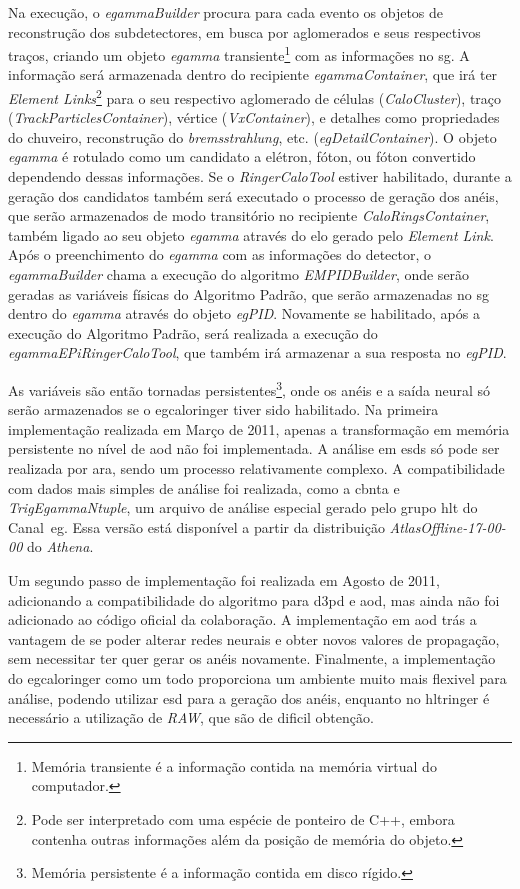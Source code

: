 Na execução, o \emph{egammaBuilder}
procura para cada evento os objetos de reconstrução dos subdetectores,
em busca por aglomerados e seus respectivos traços, criando um objeto 
\emph{egamma} transiente\footnote{Memória transiente é a informação contida na memória 
virtual do computador.} com as informações no \gls{sg}. A informação será
armazenada dentro do recipiente \emph{egammaContainer}, que irá ter \emph{Element
Links}\footnote{Pode ser interpretado com uma espécie de ponteiro de C++, embora
contenha outras informações além da posição de memória do objeto.} para o seu
respectivo aglomerado de células (\emph{CaloCluster}), traço
(\emph{TrackParticlesContainer}), vértice (\emph{VxContainer}), e detalhes como
propriedades do chuveiro, reconstrução do \emph{bremsstrahlung}, etc. (\emph{egDetailContainer}). 
O objeto \emph{egamma} é rotulado como um candidato a elétron, fóton, ou 
fóton convertido dependendo dessas informações. Se o \emph{RingerCaloTool}
estiver habilitado, durante a geração dos candidatos também será executado o
processo de geração dos anéis, que serão armazenados de modo transitório no
recipiente \emph{CaloRingsContainer}, também ligado ao seu objeto \emph{egamma}
através do elo gerado pelo \emph{Element Link}. Após o preenchimento do
\emph{egamma} com as informações do detector, o \emph{egammaBuilder} chama a
execução do algoritmo \emph{EMPIDBuilder}, onde serão geradas as variáveis 
físicas do Algoritmo Padrão, que serão armazenadas no \gls{sg} dentro do
\emph{egamma} através do objeto \emph{egPID}. Novamente se habilitado, após a
execução do Algoritmo Padrão, será realizada a execução do
\emph{egammaEPiRingerCaloTool}, que também irá armazenar a sua resposta no
\emph{egPID}.

As variáveis são então tornadas persistentes\footnote{Memória persistente é a informação
contida em disco rígido.}, onde os anéis e a saída neural só serão armazenados
se o \gls{egcaloringer} tiver sido habilitado. Na primeira implementação
realizada em Março de 2011, apenas a transformação em memória persistente 
no nível de \gls{aod} não foi implementada. A análise em \glspl{esd} 
só pode ser realizada por \gls{ara},
sendo um processo relativamente complexo.
A compatibilidade com dados mais simples de análise foi realizada, como a
\gls{cbnta} e \emph{TrigEgammaNtuple}, um arquivo de análise especial gerado
pelo grupo \gls{hlt} do Canal~\gls{eg}. Essa versão está disponível a partir da
distribuição \emph{AtlasOffline-17-00-00} do \emph{Athena}.

Um segundo passo de implementação foi realizada em Agosto de 2011, adicionando a
compatibilidade do algoritmo para \gls{d3pd} e \gls{aod}, mas ainda não foi
adicionado ao código oficial da colaboração. A implementação em \gls{aod} trás a
vantagem de se poder alterar redes neurais e obter novos valores de propagação,
sem necessitar ter quer gerar os anéis novamente. Finalmente, a implementação do 
\gls{egcaloringer} como um todo proporciona um ambiente muito
mais flexivel para análise, podendo utilizar \gls{esd} para a geração dos anéis,
enquanto no \gls{hltringer} é necessário a utilização de \emph{RAW}, que são de
dificil obtenção.




